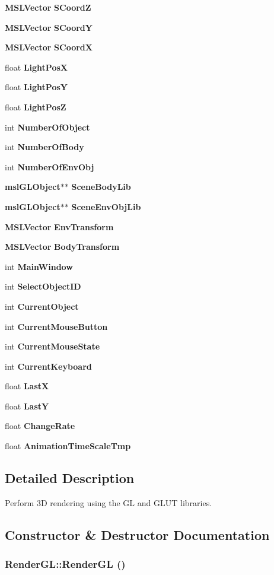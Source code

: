 \begin{CompactItemize}
{\bf MSLVector} {\bf SCoord\-Z}
\item 
{\bf MSLVector} {\bf SCoord\-Y}
\item 
{\bf MSLVector} {\bf SCoord\-X}
\item 
float {\bf Light\-Pos\-X}
\item 
float {\bf Light\-Pos\-Y}
\item 
float {\bf Light\-Pos\-Z}
\item 
int {\bf Number\-Of\-Object}
\item 
int {\bf Number\-Of\-Body}
\item 
int {\bf Number\-Of\-Env\-Obj}
\item 
{\bf msl\-GLObject}$\ast$$\ast$ {\bf Scene\-Body\-Lib}
\item 
{\bf msl\-GLObject}$\ast$$\ast$ {\bf Scene\-Env\-Obj\-Lib}
\item 
{\bf MSLVector} {\bf Env\-Transform}
\item 
{\bf MSLVector} {\bf Body\-Transform}
\item 
int {\bf Main\-Window}
\item 
int {\bf Select\-Object\-ID}
\item 
int {\bf Current\-Object}
\item 
int {\bf Current\-Mouse\-Button}
\item 
int {\bf Current\-Mouse\-State}
\item 
int {\bf Current\-Keyboard}
\item 
float {\bf Last\-X}
\item 
float {\bf Last\-Y}
\item 
float {\bf Change\-Rate}
\item 
float {\bf Animation\-Time\-Scale\-Tmp}
\end{CompactItemize}


\subsection{Detailed Description}
Perform 3D rendering using the GL and GLUT libraries.



\subsection{Constructor \& Destructor Documentation}
\subsubsection{\setlength{\rightskip}{0pt plus 5cm}Render\-GL::Render\-GL ()}\label{classRenderGL_a0}


